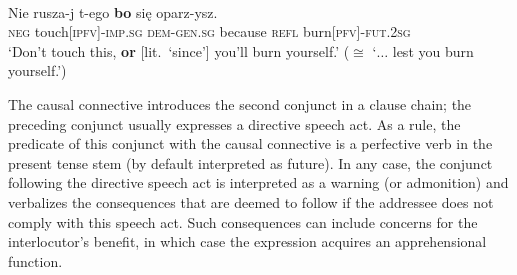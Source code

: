 \documentclass[output=paper,colorlinks,citecolor=brown]{langscibook}
\begin{document}
\largerpage[2]
\ea \label{ex:wiemer5}
\\
\gll Nie rusza-j t-ego \textbf{bo} się oparz-ysz. \\
\textsc{neg} touch[\textsc{ipfv}]-\textsc{imp.sg} \textsc{dem-gen.sg} because \textsc{refl} burn\textsc{[pfv]-fut.2sg} \\
\glt `Don't touch this, \textbf{or} [lit.\ `since'] you'll burn yourself.' ($\cong$ `$\ldots$ lest you burn yourself.') \\
\z

\noindent The causal connective introduces the second conjunct in a clause chain; the preceding conjunct usually expresses a directive speech act. As a rule, the predicate of this conjunct with the causal connective is a perfective verb in the present tense stem (by default interpreted as future). In any case, the conjunct following the directive speech act is interpreted as a warning (or admonition) and verbalizes the consequences that are deemed to follow if the addressee does not comply with this speech act. Such consequences can include concerns for the interlocutor's benefit, in which case the expression acquires an apprehensional function.
\end{document}
